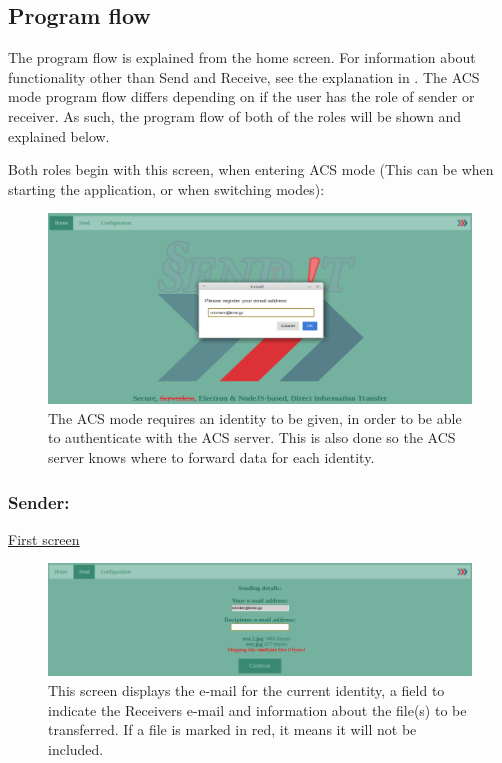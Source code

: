 \subsection{Program flow}
%
The program flow is explained from the home screen. For information about functionality other than Send and Receive, see the explanation in .
The ACS mode program flow differs depending on if the user has the role of sender or receiver. As such, the program flow of both of the roles will be shown and explained below.

Both roles begin with this screen, when entering ACS mode (This can be when starting the application, or when switching modes):
%
\begin{figure}[H]
  \centering
  \includegraphics[width=\textwidth]{Figures/ACS/pop_up}
  \decoRule
  \caption[Opening screen]{The ACS mode requires an identity to be given, in order to be able to authenticate with the ACS server. This is also done so the ACS server knows where to forward data for each identity.}
  \label{fig:ACS_pop}
\end{figure}

\subsubsection*{Sender:}
%
\noindent
\underline{First screen}
\begin{figure}[H]
  \centering
  \includegraphics[width=\textwidth]{Figures/ACS/sending}
  \decoRule
  \caption[Sending details screen]{This screen displays the e-mail for the current identity, a field to indicate the Receivers e-mail and information about the file(s) to be transferred. If a file is marked in red, it means it will not be included.}
  \label{fig:ACS_send}
\end{figure}

